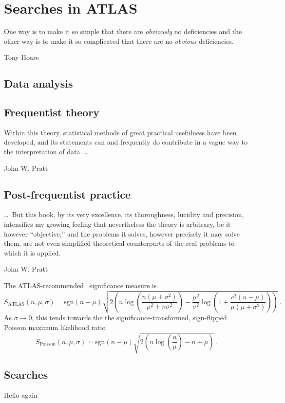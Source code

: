 \chapter{Searches in ATLAS}
\label{chapter:intro}

\epigraph{%
One way is to make it so simple that there are \emph{obviously} no deficiencies and the other way is to make it so complicated that there are
no \emph{obvious} deficiencies.%
}%
{Tony Hoare~\cite{hoare2007emperor}}



\section{Data analysis}

\section{Frequentist theory}

\epigraph{%
Within this theory, statistical methods of great practical usefulness have been
developed, and its statements can and frequently do contribute in a vague way
to the interpretation of data. \ldots%
}%
{John W. Pratt~\cite{pratt1961testing}}


\section{Post-frequentist practice}

\epigraph{%
\ldots\ But this book, by its very excellence, its thoroughness, lucidity and
precision, intensifies my growing feeling that nevertheless the theory is
arbitrary, be it however ``objective,'' and the problems it solves, however
precisely it may solve them, are not even simplified theoretical counterparts
of the real problems to which it is applied.%
}%
{John W. Pratt~\cite{pratt1961testing}}


The ATLAS-recommended~\cite{atlas_significance} significance measure is
\begin{equation}
\label{eqn:significance_atlas}
S_\mathrm{ATLAS}(n, \mu, \sigma)
= \mathrm{sgn}(n - \mu) \sqrt{2\left(
    n\log\left(\frac{n(\mu + \sigma^2)}{\mu^2 + n\sigma^2}\right)
    - \frac{\mu^2}{\sigma^2}\log\left(
        1 + \frac{c^2(n - \mu)}{\mu(\mu + \sigma^2)}
    \right)
\right)}
~.
\end{equation}
As $\sigma \rightarrow 0$, this tends towards the the significance-transformed,
sign-flipped Poisson maximum likelihood ratio
\begin{equation}
S_\mathrm{Poisson}(n, \mu, \sigma)
= \mathrm{sgn}(n - \mu) \sqrt{2\left(
    n\log\left(\frac{n}{\mu}\right) - n + \mu
\right)}
~.
\end{equation}

\section{Searches}

\clearpage

Hello again
